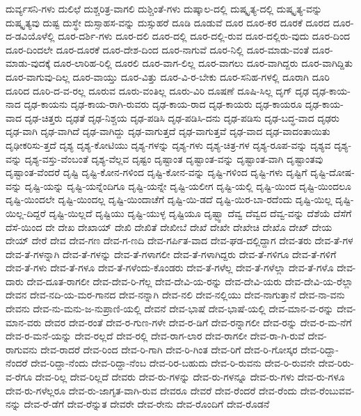 {ದುರ್ವ್ಯಸನಿ-ಗಳು
ದುಲಿಛೆ
ದುಶ್ಚರಿತ್ರ-ವಾಗಲಿ
ದುಶ್ಚಿಂತೆ-ಗಳು
ದುಷ್ಕಾಲ-ದಲ್ಲಿ
ದುಷ್ಕೃತ್ಯ-ದಲ್ಲಿ
ದುಷ್ಕೃತ್ಯ-ವನ್ನು
ದುಷ್ಕೃತ್ಯವು
ದುಷ್ಟ
ದುಸ್ಥೇ
ದುಸ್ಸಾಹಸ-ವನ್ನು
ದುಸ್ಸುಹರೆ
ದೂಡಿ
ದೂಡುವೆ
ದೂರ
ದೂರ-ಕರ
ದೂರಕೆ
ದೂರದ
ದೂರ-ದ-ಡವಿಯೊಳೆಲ್ಲಿ
ದೂರ-ದರ್ಶಿ-ಗಳು
ದೂರ-ದಲಿ
ದೂರ-ದಲ್ಲಿ
ದೂರ-ದಲ್ಲಿ-ರುವ
ದೂರ-ದಲ್ಲಿರು-ವುದು
ದೂರ-ದಿಂದ
ದೂರ-ದಿಂದಲೇ
ದೂರ-ದೂರಕೆ
ದೂರ-ದೇಶ-ದಿಂದ
ದೂರ-ನಾಗುವೆ
ದೂರ-ನಿಲ್ಲಿ
ದೂರ-ಮಾಡು-ವಂತೆ
ದೂರ-ಮಾಡು-ವುದಕ್ಕೆ
ದೂರ-ಲಾರಿಹ-ರಿಲ್ಲಿ
ದೂರಲಿ
ದೂರ-ವಾಗ-ಲಿಲ್ಲ
ದೂರ-ವಾಗಲು
ದೂರ-ವಾಗಿದ್ದರು
ದೂರ-ವಾಗಿದ್ದಿತು
ದೂರ-ವಾಗುವು-ದಿಲ್ಲ
ದೂರ-ವಾಯ್ತು
ದೂರ-ವಿತ್ತು
ದೂರ-ವಿ-ರ-ಬೇಕು
ದೂರ-ಸನಿಹ-ಗಳಲ್ಲಿ
ದೂರಾಗಿ
ದೂರಿ
ದೂರಿದ
ದೂರಿ-ದ-ವ-ರಲ್ಲ
ದೂರುವ
ದೂರು-ವಂತಿಲ್ಲ
ದೂರು-ವಿರಿ
ದೂಷಣೆ
ದೂಷಿ-ಸಿಲ್ಲ
ದೃಗ್
ದೃಢ
ದೃಢ-ಕಾಯ-ನಾದ
ದೃಢ-ಕಾಯನು
ದೃಢ-ಕಾಯ-ರಾಗಿ-ರುವರು
ದೃಢ-ಕಾಯ-ರಾದ
ದೃಢ-ಕಾಯರು
ದೃಢ-ಕಾಯರೂ
ದೃಢ-ಕಾಯ-ವಾದ
ದೃಢ-ಚಿತ್ತರು
ದೃಢತೆ
ದೃಢ-ನಿಶ್ಚಯ
ದೃಢ-ಪಡಿಸಿ
ದೃಢ-ಪಡಿಸಿ-ದನು
ದೃಢ-ಪಡಿಸು
ದೃಢ-ಬದ್ಧ-ವಾದ
ದೃಢರು
ದೃಢ-ವಾಗಿ
ದೃಢ-ವಾಗಿದೆ
ದೃಢ-ವಾಗಿದ್ದು
ದೃಢ-ವಾಗುತ್ತದೆ
ದೃಢ-ವಾಗುತ್ತವೆ
ದೃಢ-ವಾದ
ದೃಢ-ವಾದಂತಾಯಿತು
ದೃಢೀಕರಿಸು-ತ್ತದೆ
ದೃಶ್ಯ
ದೃಶ್ಯ-ಕೋಟಿಯು
ದೃಶ್ಯ-ಗಳನ್ನು
ದೃಶ್ಯ-ಗಳು
ದೃಶ್ಯ-ಚಿತ್ರ-ಗಳ
ದೃಶ್ಯ-ರೂಪ-ವನ್ನು
ದೃಶ್ಯವ
ದೃಶ್ಯ-ವನ್ನು
ದೃಶ್ಯ-ವಸ್ತು-ವೆಂಬಂತೆ
ದೃಶ್ಯ-ವೆಲ್ಲವ
ದೃಷ್ಟಂ
ದೃಷ್ಟಾಂತ
ದೃಷ್ಟಾಂತ-ವನ್ನು
ದೃಷ್ಟಾಂತ-ವಾಗಿ
ದೃಷ್ಟಾಂತವು
ದೃಷ್ಟಾಂತ-ವೆಂದರೆ
ದೃಷ್ಟಿ
ದೃಷ್ಟಿ-ಕೋನ-ಗಳಿಂದ
ದೃಷ್ಟಿ-ಕೋನ-ವನ್ನು
ದೃಷ್ಟಿ-ಗಳಿಂದ
ದೃಷ್ಟಿ-ಗಳು
ದೃಷ್ಟಿಗೆ
ದೃಷ್ಟಿ-ದೋಷ-ವನ್ನು
ದೃಷ್ಟಿ-ಯನ್ನು
ದೃಷ್ಟಿ-ಯನ್ನೆಂದಿಗೂ
ದೃಷ್ಟಿ-ಯನ್ನೇ
ದೃಷ್ಟಿ-ಯಲೀಗ
ದೃಷ್ಟಿ-ಯಲ್ಲಿ
ದೃಷ್ಟಿ-ಯಿಂದ
ದೃಷ್ಟಿ-ಯಿಂದಲೂ
ದೃಷ್ಟಿ-ಯಿಂದಲೇ
ದೃಷ್ಟಿ-ಯಿಂದಲ್ಲ
ದೃಷ್ಟಿ-ಯಿಂದಾಚೆಗೆ
ದೃಷ್ಟಿ-ಯಿ-ಡದೆ
ದೃಷ್ಟಿ-ಯಿರ-ಬಾ-ರದೆಂದು
ದೃಷ್ಟಿ-ಯಿಲ್ಲ
ದೃಷ್ಟಿ-ಯಿಲ್ಲ-ದಿದ್ದರೆ
ದೃಷ್ಟಿ-ಯಿಲ್ಲದೆ
ದೃಷ್ಟಿಯು
ದೃಷ್ಟಿ-ಯುಳ್ಳ
ದೃಷ್ಟಿಯೂ
ದೃಷ್ಟ್ವಾ
ದೆವ್ವ
ದೆವ್ವದ
ದೆವ್ವ-ವನ್ನು
ದೆಶೆಯೆ
ದೆಸೆಗೆ
ದೆಸೆ-ಯಿಂದ
ದೇ
ದೇಖ
ದೇಖಾಯ್
ದೇಖಿ
ದೇಖಿತೆ
ದೇಖೀಬೆ
ದೇಖೆ
ದೇಖೇ
ದೇಖೇಚಿ
ದೇಖೊ
ದೇಖ್
ದೇಯ
ದೇಯ್
ದೇರೆ
ದೇವ
ದೇವ-ಗಣ
ದೇವ-ಗ-ಣದಿ
ದೇವ-ಗರ್ಪಿತ-ವಾದ
ದೇವ-ಘಡ-ದಲ್ಲಿದ್ದಾಗ
ದೇವ-ತರು
ದೇವ-ತೆ-ಗಳ
ದೇವ-ತೆ-ಗಳನ್ನಾಗಿ
ದೇವ-ತೆ-ಗಳನ್ನು
ದೇವ-ತೆ-ಗಳಾಗಲೀ
ದೇವ-ತೆ-ಗಳಾಗಿದ್ದರು
ದೇವ-ತೆ-ಗಳಿಗೂ
ದೇವ-ತೆ-ಗಳಿಗೆ
ದೇವ-ತೆ-ಗಳು
ದೇವ-ತೆ-ಗಳೂ
ದೇವ-ತೆ-ಗಳೆಂದು-ಕೊಂಡರು
ದೇವ-ತೆ-ಗಳೆಲ್ಲ
ದೇವ-ತೆ-ಗಳೆಲ್ಲಾ
ದೇವ-ತೆ-ಗಳೊ
ದೇವ-ದಾರು
ದೇವ-ದೂತ-ರಾಗಲೀ
ದೇವ-ದೇವ-ರಿ-ಗೆಲ್ಲ
ದೇವ-ದೇವಿ-ಯ-ರನ್ನು
ದೇವ-ದೇವಿ-ಯರು
ದೇವ-ದೇವಿ-ಯ-ರೆಲ್ಲಾ
ದೇವನ
ದೇವ-ನದಿ-ಯ-ಮರ-ಗಾನದ
ದೇವ-ನನ್ನಾಗಿ
ದೇವ-ನಲಿ
ದೇವ-ನಲ್ಲಿಯು
ದೇವ-ನಾಗುತ್ತಾನೆ
ದೇವ-ನಾ-ವನು
ದೇವನು
ದೇವ-ನು-ಮನು-ಜ-ನುಪ್ರಾಣಿ-ಯಲ್ಲಿ
ದೇವನೆ
ದೇವ-ಭಾಷೆ
ದೇವ-ಭಾಷೆ-ಯಲ್ಲಿ
ದೇವ-ಮಾನ-ವ-ರನ್ನು
ದೇವ-ಮಾನ-ವರು
ದೇವರ
ದೇವ-ರಂತೆ
ದೇವ-ರ-ಗುಣ-ಗಳೇ
ದೇವ-ರ-ಡಿಗೆ
ದೇವ-ರನ್ನಾಗಲೀ
ದೇವ-ರನ್ನು
ದೇವ-ರ-ಮ-ನೆಗೆ
ದೇವ-ರ-ಮನೆ-ಯನ್ನು
ದೇವ-ರಲ್ಲದೆ
ದೇವ-ರಲ್ಲಿ
ದೇವ-ರಾಗ-ಲಾರ
ದೇವ-ರಾಗಲೀ
ದೇವ-ರಾ-ಗಿ-ರುವೆ
ದೇವ-ರಾಗುವನು
ದೇವ-ರಾದರೆ
ದೇವ-ರಿಂದ
ದೇವ-ರಿ-ಗಾಗಿ
ದೇವ-ರಿ-ಗಿಂತ
ದೇವ-ರಿಗೆ
ದೇವ-ರಿ-ಗೋಸ್ಕರ
ದೇವ-ರಿದ್ದಾ-ನೆಂದರೆ
ದೇವ-ರಿದ್ದಾ-ನೆಂದು
ದೇವ-ರಿದ್ದಾ-ನೆಂಬ
ದೇವ-ರಿರ-ಬಹುದು
ದೇವ-ರಿ-ರುವನು
ದೇವ-ರಿ-ರುವನೇ
ದೇವ-ರಿರು-ವ-ರೆಗೂ
ದೇವ-ರಿಲ್ಲ
ದೇವ-ರಿಲ್ಲದೆ
ದೇವರು
ದೇವ-ರು-ಗಳನ್ನು
ದೇವ-ರು-ಗಳನ್ನೂ
ದೇವ-ರು-ಗಳು
ದೇವ-ರು-ಗಳೂ
ದೇವ-ರು-ಗಳೆಲ್ಲರೂ
ದೇವ-ರು-ಜಾಗೃತ-ವಾಗಿ-ರುವ
ದೇವರೂ
ದೇವರೆ
ದೇವ-ರೆಂದರೆ
ದೇವ-ರೆಂದು
ದೇವ-ರೆಂಬುವವ-ನನ್ನು
ದೇವ-ರೆ-ಡೆಗೆ
ದೇವ-ರೆನ್ನುತ
ದೇವರೇ
ದೇವ-ರೇನು
ದೇವ-ರೊಂದಿಗೆ
ದೇವ-ರೊಡನೆ
}
